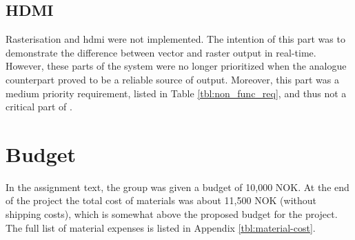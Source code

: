\subsection{HDMI}
Rasterisation and \gls{hdmi} were not implemented.
The intention of this part was to demonstrate the difference between vector and raster output in real-time.
However, these parts of the system were no longer prioritized when the analogue counterpart proved to be a reliable source of output.
Moreover, this part was a medium priority requirement, listed in Table \ref{tbl:non_func_req}, and thus not a critical part of \vthreek.

\section{Budget}
In the assignment text, the group was given a budget of 10,000 NOK.
At the end of the project the total cost of materials was about 11,500 NOK (without shipping costs), which is somewhat above the proposed budget for the project.
The full list of material expenses is listed in Appendix \ref{tbl:material-cost}.

